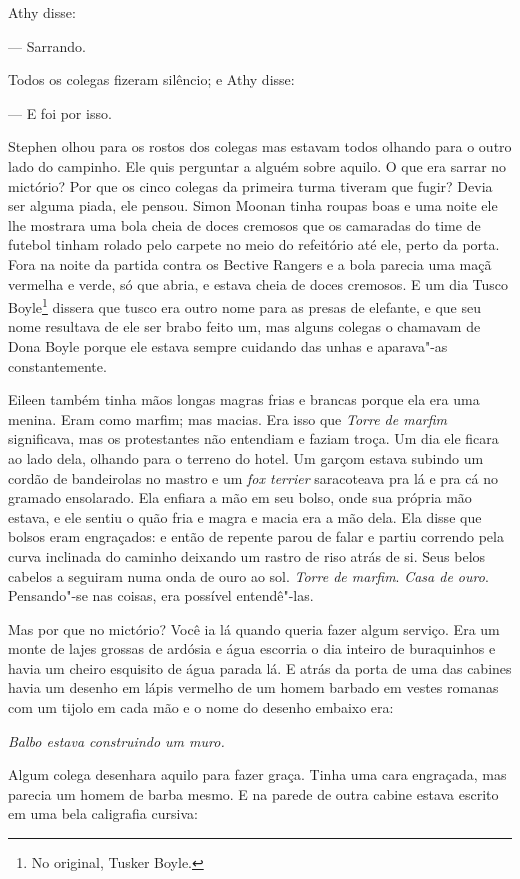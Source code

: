 Athy disse:

 --- Sarrando. 

Todos os colegas fizeram silêncio; e Athy disse:

 --- E foi por isso.

Stephen olhou para os rostos dos colegas mas estavam todos olhando para
o outro lado do campinho. Ele quis perguntar a alguém sobre aquilo. O
que era sarrar no mictório? Por que os cinco colegas da primeira turma
tiveram que fugir? Devia ser alguma piada, ele pensou. Simon Moonan
tinha roupas boas e uma noite ele lhe mostrara uma bola cheia de doces
cremosos que os camaradas do time de futebol tinham rolado pelo carpete
no meio do refeitório até ele, perto da porta. Fora na noite da partida
contra os Bective Rangers e a bola parecia uma maçã vermelha e verde,
só que abria, e estava cheia de doces cremosos. E um dia Tusco
Boyle\footnote{ No original, Tusker Boyle.} dissera que tusco era outro 
nome para as presas de elefante, e que seu nome resultava de ele ser brabo
feito um, mas alguns colegas o chamavam de Dona Boyle porque ele estava
sempre cuidando das unhas e aparava"-as constantemente.

Eileen também tinha mãos longas magras frias e brancas porque ela era
uma menina. Eram como marfim; mas macias. Era isso que \textit{Torre de
marfim} significava, mas os protestantes não entendiam e faziam troça.
Um dia ele ficara ao lado dela, olhando para o terreno do hotel. Um
garçom estava subindo um cordão de bandeirolas no mastro e um
\textit{fox terrier} saracoteava pra lá e pra cá no gramado ensolarado.
Ela enfiara a mão em seu bolso, onde sua própria mão estava, e ele
sentiu o quão fria e magra e macia era a mão dela. Ela disse que bolsos
eram engraçados: e então de repente parou de falar e partiu correndo
pela curva inclinada do caminho deixando um rastro de riso atrás de
si. Seus belos cabelos a seguiram numa onda de ouro ao sol.
\textit{Torre de marfim}. \textit{Casa de ouro}. Pensando"-se nas
coisas, era possível entendê"-las.

Mas por que no mictório? Você ia lá quando queria fazer algum serviço.
Era um monte de lajes grossas de ardósia e água escorria o dia inteiro
de buraquinhos e havia um cheiro esquisito de água parada lá. E atrás
da porta de uma das cabines havia um desenho em lápis vermelho de um
homem barbado em vestes romanas com um tijolo em cada mão e o nome do
desenho embaixo era:

\textit{Balbo estava construindo um muro.}

Algum colega desenhara aquilo para fazer graça. Tinha uma cara engraçada,
mas parecia um homem de barba mesmo. E na parede de outra cabine estava
escrito em uma bela caligrafia cursiva:

